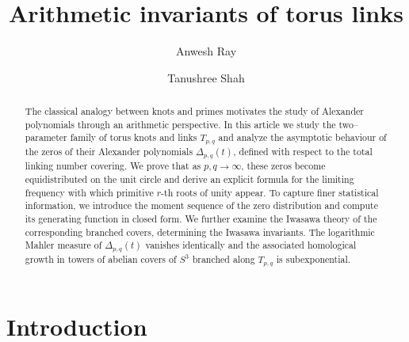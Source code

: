 \documentclass[table]{amsart}
\numberwithin{equation}{section}
\begin{document}
\author[A.~Ray]{Anwesh Ray}
\address[Ray]{Chennai Mathematical Institute, H1, SIPCOT IT Park, Kelambakkam, Siruseri, Tamil Nadu 603103, India}

\title[]{Arithmetic invariants of torus links}
\author[T.~Shah]{Tanushree Shah}
\address[Shah]{Chennai Mathematical Institute, H1, SIPCOT IT Park, Kelambakkam, Siruseri, Tamil Nadu 603103, India}






\maketitle


\begin{abstract}
The classical analogy between knots and primes motivates the study of Alexander polynomials through an arithmetic perspective. In this article we study the two–parameter family of torus knots and links \(T_{p,q}\) and analyze the asymptotic behaviour of the zeros of their Alexander polynomials \(\Delta_{p,q}(t)\), defined with respect to the total linking number covering.
 We prove that as $p,q\rightarrow \infty$, these zeros become equidistributed on the unit circle and derive an explicit formula for the limiting frequency with which primitive \(r\)-th roots of unity appear. To capture finer statistical information, we introduce the moment sequence of the zero distribution and compute its generating function in closed form. We further examine the Iwasawa theory of the corresponding branched covers, determining the Iwasawa invariants. The logarithmic Mahler measure of \(\Delta_{p,q}(t)\) vanishes identically and the associated homological growth in towers of abelian covers of \(S^3\) branched along \(T_{p,q}\) is subexponential.
\end{abstract}



\section{Introduction}
\end{document}
